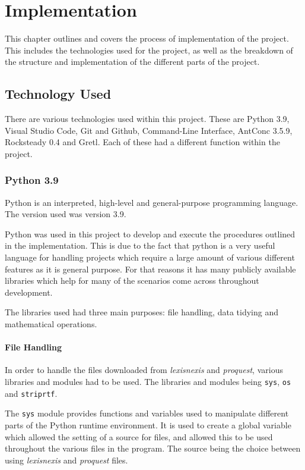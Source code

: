
\chapter{Implementation}

This chapter outlines and covers the process of implementation of the project. This includes the technologies used for the project, as well as the breakdown of the structure and implementation of the different parts of the project.

\section{Technology Used}

There are various technologies used within this project. These are Python 3.9, Visual Studio Code, Git and Github, Command-Line Interface, AntConc 3.5.9, Rocksteady 0.4 and Gretl. Each of these had a different function within the project.

\subsection{Python 3.9}

Python is an interpreted, high-level and general-purpose programming language. The version used was version 3.9. 

Python was used in this project to develop and execute the procedures outlined in the implementation. This is due to the fact that python is a very useful language for handling projects which require a large amount of various different features as it is general purpose. For that reasons it has many publicly available libraries which help for many of the scenarios come across throughout development.

The libraries used had three main purposes: file handling, data tidying and mathematical operations.

\subsubsection{File Handling}

In order to handle the files downloaded from \emph{lexisnexis} and \emph{proquest}, various libraries and modules had to be used. The libraries and modules being \verb|sys|, \verb|os| and \verb|striprtf|.

The \verb|sys| module provides functions and variables used to manipulate different parts of the Python runtime environment. It is used to create a global variable which allowed the setting of a source for files, and allowed this to be used throughout the various files in the program. The source being the choice between using \emph{lexisnexis} and \emph{proquest} files.

